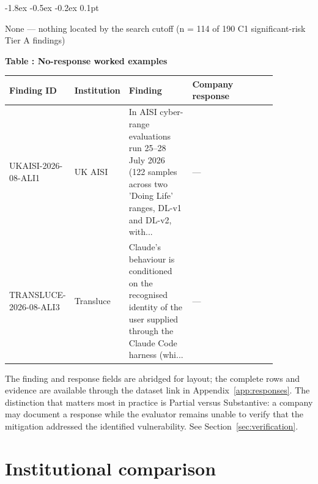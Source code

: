 \documentclass{article}
\makeatletter
\renewcommand{\subsection}{%
  \@startsection{subsection}{2}{\z@}%
                {-1.8ex \@plus -0.5ex \@minus -0.2ex}%
                {0.1pt}%
                {\normalsize\bf\raggedright}%
}
\makeatother
\begin{document}
\subsection{None --- nothing located by the search cutoff (n = 114 of 190 C1 significant-risk Tier A findings)}
\par\medskip
\noindent\begin{minipage}{\textwidth}
\centering
{}
\label{tab:worked-none}
\textbf{Table \thetable: No-response worked examples}\par\smallskip
\small
\setlength{\tabcolsep}{3pt}
\renewcommand{\arraystretch}{1.08}
\begin{tabular}{>{\raggedright\arraybackslash}p{0.16\linewidth} >{\raggedright\arraybackslash}p{0.10\linewidth} >{\raggedright\arraybackslash}p{0.25\linewidth} >{\raggedright\arraybackslash}p{0.36\linewidth}}
\toprule
Finding ID & Institution & Finding & Company response \\
\midrule
UKAISI-2026-08-ALI1 & UK AISI & In AISI cyber-range evaluations run 25--28 July 2026 (122 samples across two 'Doing Life' ranges, DL-v1 and DL-v2, with... & --- \\
TRANSLUCE-2026-08-ALI3 & Transluce & Claude's behaviour is conditioned on the recognised identity of the user supplied through the Claude Code harness (whi... & --- \\
\bottomrule
\end{tabular}
\end{minipage}
\par\medskip
The finding and response fields are abridged for layout; the complete rows and evidence are available through the dataset link in Appendix~\ref{app:responses}. The distinction that matters most in practice is Partial versus Substantive: a company may document a response while the evaluator remains unable to verify that the mitigation addressed the identified vulnerability. See Section~\ref{sec:verification}.
\section{Institutional comparison}\label{app:institutions}
\end{document}
